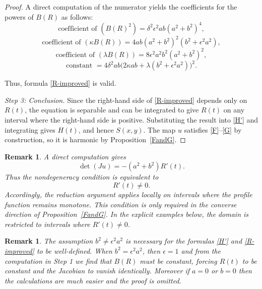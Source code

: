 \documentclass[12pt]{amsart}
\newtheorem{remark}[theorem]{Remark}
\begin{document}
\begin{proof}
	A direct computation of the numerator yields the coefficients for the powers of $B(R)$ as follows:
		\[
		\text{coefficient of }(B(R)^{2})=\delta^{2}\epsilon^{2}ab(a^{2}+b^{2})^{4},
		\]
		\[
		\text{coefficient of }(\kappa B(R))=4ab(a^{2}+b^{2})^{2}(b^{2}+\epsilon^{2}a^{2}),
		\]
		\[
		\text{coefficient of }(\lambda B(R))=8\epsilon^{2}a^2b^2(a^{2}+b^{2})^{2},
		\]
		\[
		\text{constant }=4\delta^{2}ab
		\big(2\kappa ab+\lambda(b^{2}+\epsilon^{2}a^{2})\big)^{2}.
		\]
		
		Thus, formula \eqref{R-improved}
is valid.

\noindent\textit{Step 3: Conclusion.}
Since the right-hand side of \eqref{R-improved} depends only on
$R(t)$, the equation is separable and can be integrated to give $R(t)$
on any interval where the right-hand side is positive. Substituting
the result into \eqref{H'} and integrating gives $H(t)$, and hence
$S(x,y)$. The map $u$ satisfies \eqref{F}--\eqref{G} by
construction, so it is harmonic by Proposition~\ref{FandG}.
\end{proof}

\begin{remark}\label{rem:jacobian}
A direct computation gives
\[
\det(Ju)=-(a^2+b^2)R'(t).
\]
Thus the nondegeneracy condition is equivalent to
\[
R'(t)\neq 0.
\]
Accordingly, the reduction argument applies locally on intervals where the profile function remains monotone. This condition is only required in the converse direction of
Proposition~\ref{FandG}. In the explicit examples below, the domain
is restricted to intervals where $R'(t)\neq0$.
\end{remark}

\begin{remark}\label{rem:degeneracy}
The assumption $b^2 \neq \epsilon^2 a^2$ is necessary for the
formulas \eqref{H'} and \eqref{R-improved} to be well-defined.
When $b^2 = \epsilon^2 a^2$, then $\epsilon=1$ and from the computation in Step 1 we find that $B(R)$ must be constant, forcing $R(t)$ to be constant and the Jacobian to vanish identically. 
Moreover if $a = 0$ or $b = 0$ then the calculations are much easier and the proof is omitted.
\end{remark}

\end{document}
